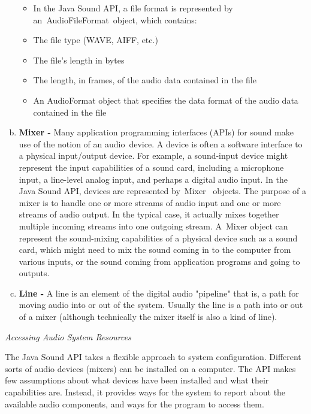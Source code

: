 \begin{enumerate}[a.]
                \begin{itemize}
                        \item In the Java Sound API, a file format is represented by an AudioFileFormat object, which contains:
                        \item The file type (WAVE, AIFF, etc.)
                        \item The file's length in bytes
                        \item The length, in frames, of the audio data contained in the file
                        \item An AudioFormat object that specifies the data format of the audio data contained in the file
                \end{itemize}

        \item \textbf{Mixer -} 
                Many application programming interfaces (APIs) for sound make use of the notion of an audio device. A device is often a software interface
                to a physical input/output device. For example, a sound-input device might represent the input capabilities of a sound card, including a
                microphone input, a line-level analog input, and perhaps a digital audio input. In the Java Sound API, devices are represented by Mixer
                 objects. The purpose of a mixer is to handle one or more streams of audio input and one or more streams of audio output. In the typical
                case, it actually mixes together multiple incoming streams into one outgoing stream. A Mixer object can represent the sound-mixing capabilities
                of a physical device such as a sound card, which might need to mix the sound coming in to the computer from various inputs, or the sound coming
                from application programs and going to outputs.

        \item \textbf{Line -} 
                A line is an element of the digital audio "pipeline" that is, a path for moving audio into or out of the system. Usually the line is a path into or out of a mixer
                (although technically the mixer itself is also a kind of line). 

\end{enumerate}

\textit{Accessing Audio System Resources}

The Java Sound API takes a flexible approach to system configuration. Different sorts of audio devices (mixers) can be installed on a computer. The
API makes few assumptions about what devices have been installed and what their capabilities are. Instead, it provides ways for the system to report
about the available audio components, and ways for the program to access them.

